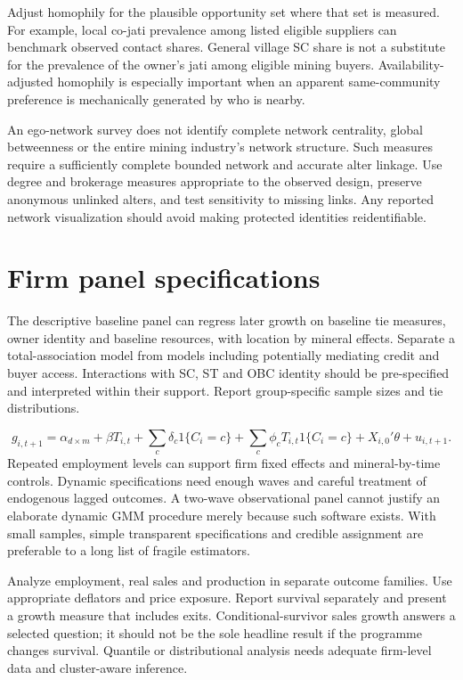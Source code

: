\documentclass[11pt,a4paper]{report}
\begin{document}
Adjust homophily for the plausible opportunity set where that set is measured. For example, local co-jati prevalence among listed eligible suppliers can benchmark observed contact shares. General village SC share is not a substitute for the prevalence of the owner's jati among eligible mining buyers. Availability-adjusted homophily is especially important when an apparent same-community preference is mechanically generated by who is nearby.

An ego-network survey does not identify complete network centrality, global betweenness or the entire mining industry's network structure. Such measures require a sufficiently complete bounded network and accurate alter linkage. Use degree and brokerage measures appropriate to the observed design, preserve anonymous unlinked alters, and test sensitivity to missing links. Any reported network visualization should avoid making protected identities reidentifiable.

\section{Firm panel specifications}
The descriptive baseline panel can regress later growth on baseline tie measures, owner identity and baseline resources, with location by mineral effects. Separate a total-association model from models including potentially mediating credit and buyer access. Interactions with SC, ST and OBC identity should be pre-specified and interpreted within their support. Report group-specific sample sizes and tie distributions.

\[
g_{i,t+1}=\alpha_{d\times m}+\beta T_{i,t}
+\sum_c\delta_c1\{C_i=c\}
+\sum_c\phi_cT_{i,t}1\{C_i=c\}+X_{i,0}'\theta+u_{i,t+1}.
\]
Repeated employment levels can support firm fixed effects and mineral-by-time controls. Dynamic specifications need enough waves and careful treatment of endogenous lagged outcomes. A two-wave observational panel cannot justify an elaborate dynamic GMM procedure merely because such software exists. With small samples, simple transparent specifications and credible assignment are preferable to a long list of fragile estimators.

Analyze employment, real sales and production in separate outcome families. Use appropriate deflators and price exposure. Report survival separately and present a growth measure that includes exits. Conditional-survivor sales growth answers a selected question; it should not be the sole headline result if the programme changes survival. Quantile or distributional analysis needs adequate firm-level data and cluster-aware inference.
\end{document}
